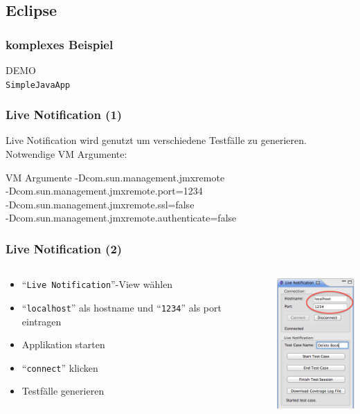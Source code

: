 \documentclass{beamer}
\begin{document}
  \subsection{Eclipse}
  \begin{frame}\frametitle{komplexes Beispiel}
    \centering
    \Huge{DEMO}\\
    \centering
    \normalsize{\texttt{SimpleJavaApp}}\\
  \end{frame}

  \begin{frame}\frametitle{Live Notification (1)}
    Live Notification wird genutzt um verschiedene Testfälle zu generieren.\\
    Notwendige VM Argumente:
    \begin{block}{VM Argumente}
      -Dcom.sun.management.jmxremote \\
      -Dcom.sun.management.jmxremote.port=1234 \\
      -Dcom.sun.management.jmxremote.ssl=false \\
      -Dcom.sun.management.jmxremote.authenticate=false
    \end{block}
  \end{frame}

  \begin{frame}\frametitle{Live Notification (2)}
    \begin{columns}
      \begin{column}{5cm}
        \begin{itemize}
          \item ``\texttt{Live Notification}''-View wählen
          \item ``\texttt{localhost}'' als hostname und ``\texttt{1234}'' als port eintragen
          \item Applikation starten
          \item ``\texttt{connect}'' klicken
          \item Testfälle generieren
        \end{itemize}
        \vspace{1cm}
      \end{column}
      \begin{column}{5cm}
        \begin{overprint}
          \includegraphics[height=50mm]{pictures/demo_eclipse/01_live_notification.png}
        \end{overprint}
      \end{column}
    \end{columns}
  \end{frame}
\end{document}
